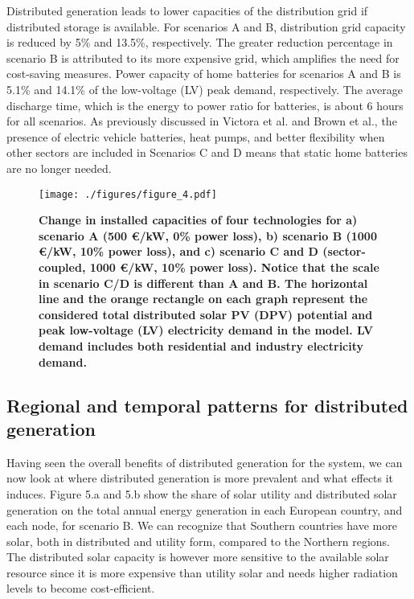 \documentclass[review]{elsarticle}
\begin{document}
Distributed generation leads to lower capacities of the distribution grid if distributed storage is available. For scenarios A and B, distribution grid capacity is reduced by 5\% and 13.5\%, respectively. The greater reduction percentage in scenario B is attributed to its more expensive grid, which amplifies the need for cost-saving measures. Power capacity of home batteries for scenarios A and B is 5.1\% and 14.1\% of the low-voltage (LV) peak demand, respectively. The average discharge time, which is the energy to power ratio for batteries, is about 6 hours for all scenarios. As previously discussed in Victora et al.\cite{victoria_2019role} and Brown et al.\cite{brown_2018}, the presence of electric vehicle batteries, heat pumps, and better flexibility when other sectors are included in Scenarios C and D means that static home batteries are no longer needed.

\begin{figure}
   \texttt{[image: ./figures/figure\_4.pdf]}
   \caption{\textbf{Change in installed capacities of four technologies for a) scenario A (500 €/kW, 0\% power loss), b) scenario B (1000 €/kW, 10\% power loss), and c) scenario C and D (sector-coupled, 1000 €/kW, 10\% power loss). Notice that the scale in scenario C/D is different than A and B. 
   The horizontal line and the orange rectangle on each graph represent the considered total distributed solar PV (DPV) potential and peak low-voltage (LV) electricity demand in the model. LV demand includes both residential and industry electricity demand.}}
   \label{fig:capacities}
\end{figure}


\subsection{Regional and temporal patterns for distributed generation}

Having seen the overall benefits of distributed generation for the system, we can now look at where distributed generation is more prevalent and what effects it induces. Figure 5.a and 5.b show the share of solar utility and distributed solar generation on the total annual energy generation in each European country, and each node, for scenario B. We can recognize that Southern countries have more solar, both in distributed and utility form, compared to the Northern regions. The distributed solar capacity is however more sensitive to the available solar resource since it is more expensive than utility solar and needs higher radiation levels to become cost-efficient. 
\end{document}
